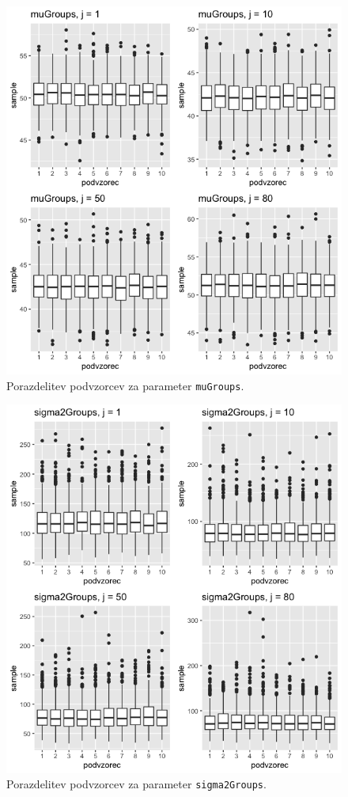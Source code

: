 \documentclass[a4paper,11pt]{article}
\begin{document}
\begin{figure}[ht!]
    \centering
    \includegraphics[width = 150mm]{Slike/vzorci_muGroups.png}
    \caption{Porazdelitev podvzorcev za parameter \texttt{muGroups}.}
\end{figure}
\newpage
\begin{figure}[ht!]
    \centering
    \includegraphics[width = 150mm]{Slike/vzorci_sigma2Groups.png}
    \caption{Porazdelitev podvzorcev za parameter \texttt{sigma2Groups}.}
\end{figure}
\end{document}

